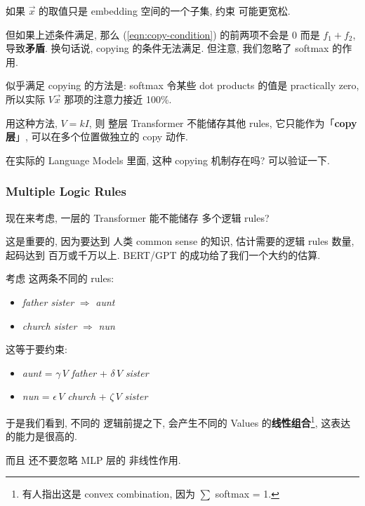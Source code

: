 \begin{preview}
\begin{minipage}{\textwidth}
\begin{tcolorbox}[breakable, parbox=false, fonttitle=\bfseries, title={位置 Copy 机制的分析}]
如果 $\vec{x}$ 的取值只是 embedding 空间的一个子集, 约束 可能更宽松.

但如果上述条件满足, 那么 (\ref{eqn:copy-condition}) 的前两项不会是 0 而是 $f_1 + f_2$, 导致\textbf{矛盾}.  换句话说, copying 的条件无法满足.  但注意, 我们忽略了 softmax 的作用.

似乎满足 copying 的方法是: softmax 令某些 dot products 的值是 practically zero, 所以实际 $V \vec{x}$ 那项的注意力接近 100\%.

用这种方法, $V = k I$, 则 整层 Transformer 不能储存其他 rules, 它只能作为「\textbf{copy 层}」, 可以在多个位置做独立的 copy 动作.  

在实际的 Language Models 里面, 这种 copying 机制存在吗?  可以验证一下.

\end{tcolorbox}

\subsubsection{Multiple Logic Rules}

现在来考虑, 一层的 Transformer 能不能储存 多个逻辑 rules?

这是重要的, 因为要达到 人类 common sense 的知识, 估计需要的逻辑 rules 数量, 起码达到 百万或千万以上.  BERT/GPT 的成功给了我们一个大约的估算.

考虑 这两条不同的 rules:
\begin{itemize}
	\item \textit{father {\color{red}sister}} $\Rightarrow$ \textit{aunt}
	\item \textit{church {\color{red}sister}} $\Rightarrow$ \textit{nun}
\end{itemize}
这等于要约束:
\begin{itemize}
	\item \textit{aunt} = $\gamma \, V$ \textit{father} + $\delta \, V$ \textit{sister}
	\item \textit{nun} = $\epsilon \, V$ \textit{church} + $\zeta \, V$ \textit{sister}
\end{itemize}
于是我们看到, 不同的 逻辑前提之下, 会产生不同的 Values 的\textbf{线性组合}\footnote{有人指出这是 convex combination, 因为 $\sum$ softmax = 1.}, 这表达的能力是很高的.

而且 还不要忽略 MLP 层的 非线性作用.

\end{minipage}
\end{preview}

